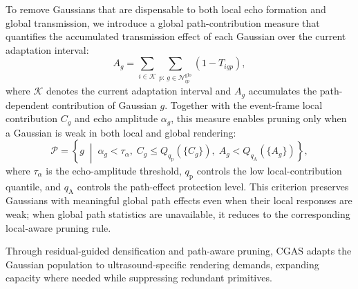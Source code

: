 To remove Gaussians that are dispensable to both local echo formation and
global transmission, we introduce a global path-contribution measure that
quantifies the accumulated transmission effect of each Gaussian over the
current adaptation interval:
\begin{equation}
A_g
=
\sum_{i\in\mathcal K}
\sum_{p:\,g\in\mathcal N^{\mathrm{glo}}_{ip}}
\left(
1-T_{igp}
\right),
\label{eq:global-path-contribution}
\end{equation}
where $\mathcal K$ denotes the current adaptation interval and $A_g$
accumulates the path-dependent contribution of Gaussian $g$. Together with the
event-frame local contribution $C_g$ and echo amplitude $\alpha_g$, this
measure enables pruning only when a Gaussian is weak in both local and global
rendering:
\begin{equation}
\mathcal P
=
\left\{
g
\;\middle|\;
\alpha_g<\tau_{\alpha},\;
C_g\leq Q_{q_{\mathrm p}}(\{C_g\}),\;
A_g<Q_{q_{\mathrm A}}(\{A_g\})
\right\},
\label{eq:path-aware-pruning}
\end{equation}
where $\tau_{\alpha}$ is the echo-amplitude threshold,
$q_{\mathrm p}$ controls the low local-contribution quantile, and
$q_{\mathrm A}$ controls the path-effect protection level. This criterion
preserves Gaussians with meaningful global path effects even when their local
responses are weak; when global path statistics are unavailable, it reduces
to the corresponding local-aware pruning rule.

Through residual-guided densification and path-aware pruning, CGAS adapts the
Gaussian population to ultrasound-specific rendering demands, expanding
capacity where needed while suppressing redundant primitives.